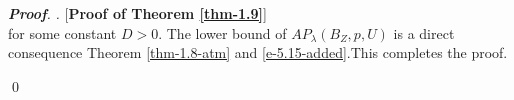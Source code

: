 \documentclass[a4paper,11pt, reqno]{amsart}
\theoremstyle{definition}
\newenvironment{pf}[1][]{%
	\vskip 3mm
	\noindent
	\ifthenelse{\equal{#1}{}}%
	{{\slshape {\bf Proof}. }}%
	{{\slshape #1.} }%
}%
{\qed\bigskip}
\newcommand{\comment}[1]{}
\begin{document}
\begin{pf} [{\bf Proof of Theorem \ref{thm-1.9}}]
\begin{equation}
\end{equation}
for some constant $D>0$. The lower bound of $AP_{\lambda}(B_{Z}, p,U)$ is a direct consequence Theorem \ref{thm-1.8-atm} and \eqref{e-5.15-added}.This completes the proof.
\comment{Observe that $1<t \leq s$, and so $(s-t)/mst \geq 0$. Using this fact, from \eqref{e-5.12}, we obtain 
	\begin{equation*}
		R^m_{\lambda}(B_Z,p,U) \geq\lambda^{\frac{1}{m}} \, \tilde{D} \left(1+\frac{n}{m}\right)^{-\frac{(s-1)}{s}}\, \left(1+\frac{n}{m}\right)^{\frac{(s-t)}{mst}} \geq \lambda^{\frac{1}{m}} \, \tilde{D}\, \left(1+\frac{n}{m}\right)^{-\frac{(s-1)}{s}}.
\end{equation*}}
\end{pf}
\end{document}
